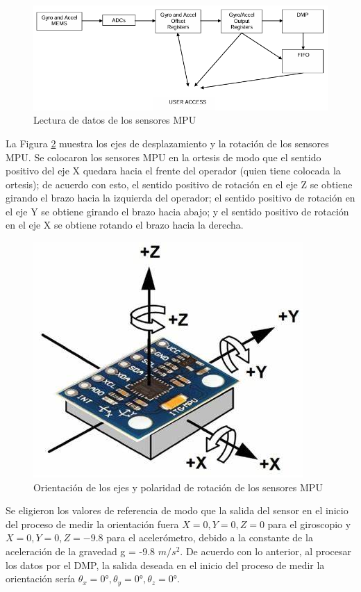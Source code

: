 \documentclass[12pt, twoside]{report}
\begin{document}
\begin{figure}[htb]
	\centering
	\includegraphics[scale=0.8]{salidaMPU.png}
	\caption{Lectura de datos de los sensores MPU}
	\label{fig:salidaMPU}
\end{figure}

La Figura \ref{fig:ejes} muestra los ejes de desplazamiento y la rotación de los sensores MPU. Se colocaron los sensores MPU en la ortesis de modo que el sentido positivo del eje X quedara hacia el frente del operador (quien tiene colocada la ortesis); de acuerdo con esto, el sentido positivo de rotación en el eje Z se obtiene girando el brazo hacia la izquierda del operador; el sentido positivo de rotación en el eje Y se obtiene girando el brazo hacia abajo; y el sentido positivo de rotación en el eje X se obtiene rotando el brazo hacia la derecha.

\begin{figure}[htb]
	\centering
	\includegraphics[scale=0.5]{ejes.jpeg}
	\caption{Orientación de los ejes y polaridad de rotación de los sensores MPU}
	\label{fig:ejes}
\end{figure}

Se eligieron los valores de referencia de modo que la salida del sensor en el inicio del proceso de medir la orientación fuera $X=0, Y=0, Z=0$ para el giroscopio y $X=0, Y=0, Z=-9.8$ para el acelerómetro, debido a la constante de la aceleración de la gravedad g = -9.8  $m/s^2$. De acuerdo con lo anterior, al procesar los datos por el DMP, la salida deseada en el inicio del proceso de medir la orientación sería $\theta_x = 0°,\theta_y = 0°,\theta_z = 0°$.
\end{document}
